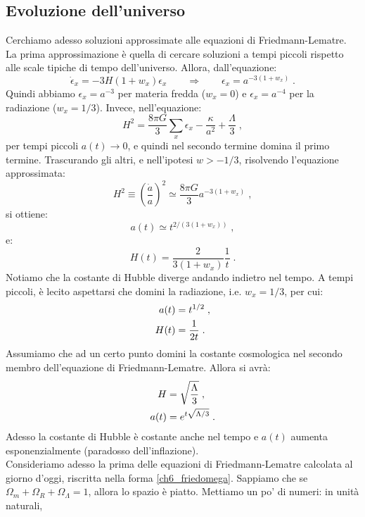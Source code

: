 \documentclass[12pt,a4paper]{report}
\theoremstyle{definition}
\begin{document}
\subsection{Evoluzione dell'universo}
Cerchiamo adesso soluzioni approssimate alle equazioni di Friedmann-Lematre. La prima approssimazione è quella di cercare soluzioni a tempi piccoli rispetto alle scale tipiche di tempo dell'universo. Allora, dall'equazione:
\begin{equation}
\dot{\epsilon}_x=-3H(1+w_x)\epsilon_x\qquad \Longrightarrow\qquad \epsilon_x= a^{-3(1+w_x)}\;.
\end{equation}
Quindi abbiamo $\epsilon_x=a^{-3}$ per materia fredda ($w_x=0$) e $\epsilon_x=a^{-4}$ per la radiazione ($w_x=1/3$). Invece, nell'equazione:
$$
H^2=\frac{8\pi G}{3}\sum_x\epsilon_x-\frac{\kappa}{a^2}+\frac{\Lambda}{3}\;,
$$
per tempi piccoli $a(t)\to 0$, e quindi nel secondo termine domina il primo termine. Trascurando gli altri, e nell'ipotesi $w>-1/3$, risolvendo l'equazione approssimata:
\begin{equation}
H^2\equiv \left(\frac{\dot{a}}{a}\right)^2\simeq \frac{8\pi G}{3}a^{-3(1+w_x)}\;,
\end{equation}
si ottiene:
\begin{equation}
a(t)\simeq t^{2/(3(1+w_x))}\;,
\end{equation}
e:
\begin{equation}
H(t)=\frac{2}{3(1+w_x)}\frac{1}{t}\;.
\end{equation}
Notiamo che la costante di Hubble diverge andando indietro nel tempo. A tempi piccoli, è lecito aspettarsi che domini la radiazione, i.e. $w_x=1/3$, per cui:
\begin{align}
a(t) &= t^{1/2}\;, \notag \\
H(t) &= \frac{1}{2t}\;.
\end{align}
Assumiamo che ad un certo punto domini la costante cosmologica nel secondo membro dell'equazione di Friedmann-Lematre. Allora si avrà:
\begin{align}
H &= \sqrt{\frac{\Lambda}{3}}\;, \notag \\
a(t) &= e^{t\sqrt{\Lambda/3}}\;.
\end{align}
Adesso la costante di Hubble è costante anche nel tempo e $a(t)$ aumenta esponenzialmente (paradosso dell'inflazione). \\
Consideriamo adesso la prima delle equazioni di Friedmann-Lematre calcolata al giorno d'oggi, riscritta nella forma \eqref{ch6_friedomega}. Sappiamo che se $\Omega_m+\Omega_R+\Omega_{\Lambda}=1$, allora lo spazio è piatto. Mettiamo un po' di numeri: in unità naturali,
\end{document}
